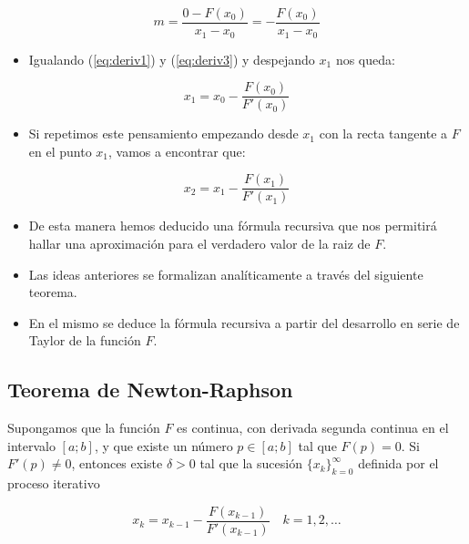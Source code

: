 \documentclass[]{book}
\providecommand{\tightlist}{%
  \setlength{\itemsep}{0pt}\setlength{\parskip}{0pt}}
\begin{document}
\begin{equation}
\label{eq:deriv3}
m = \frac{0 - F(x_0)}{x_1 - x_0} = - \frac{F(x_0)}{x_1 - x_0}
\end{equation}

\begin{itemize}
\tightlist
\item
  Igualando (\ref{eq:deriv1}) y (\ref{eq:deriv3}) y despejando \(x_1\) nos queda:
\end{itemize}

\begin{equation}
\label{eq:deriv4}
x_1 = x_0 - \frac{F(x_0)}{F'(x_0)}
\end{equation}

\begin{itemize}
\tightlist
\item
  Si repetimos este pensamiento empezando desde \(x_1\) con la recta tangente a \(F\) en el punto \(x_1\), vamos a encontrar que:
\end{itemize}

\begin{equation}
\label{eq:deriv5}
x_2 = x_1 - \frac{F(x_1)}{F'(x_1)}
\end{equation}

\begin{itemize}
\item
  De esta manera hemos deducido una fórmula recursiva que nos permitirá hallar una aproximación para el verdadero valor de la raiz de \(F\).
\item
  Las ideas anteriores se formalizan analíticamente a través del siguiente teorema.
\item
  En el mismo se deduce la fórmula recursiva a partir del desarrollo en serie de Taylor de la función \(F\).
\end{itemize}

\hypertarget{teorema-de-newton-raphson}{%
\subsection{Teorema de Newton-Raphson}\label{teorema-de-newton-raphson}}

Supongamos que la función \(F\) es continua, con derivada segunda continua en el intervalo \([a; b]\), y que existe un número \(p \in [a; b]\) tal que \(F(p) = 0\). Si \(F'(p) \neq 0\), entonces existe \(\delta > 0\) tal que la sucesión \(\{x_k\}_{k=0}^{\infty}\) definida por el proceso iterativo

\[
x_k = x_{k-1} - \frac{F(x_{k-1})}{F'(x_{k-1})} \quad k = 1, 2, \dots
\]
\end{document}
